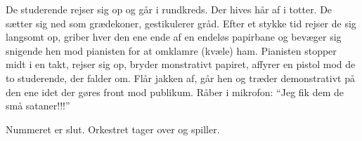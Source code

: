 \documentclass[a4paper,11pt]{article}
\begin{document}
\begin{sketch}
{De studerende rejser sig op og går i rundkreds.  Der hives hår af i
totter.  De sætter sig ned som grædekoner, gestikulerer gråd.  Efter
et stykke tid rejser de sig langsomt op, griber hver den ene ende af
en endeløs papirbane og bevæger sig snigende hen mod pianisten for at
omklamre (kvæle) ham.  Pianisten stopper midt i en takt, rejser sig
op, bryder monstrativt papiret, affyrer en pistol mod de to
studerende, der falder om.  Flår jakken af, går hen og træder
demonstrativt på den ene idet der gøres front mod publikum.  Råber i
mikrofon: "`Jeg fik dem de små sataner!!!"'

Nummeret er slut.  Orkestret tager over og spiller.

}

\end{sketch}
\end{document}
